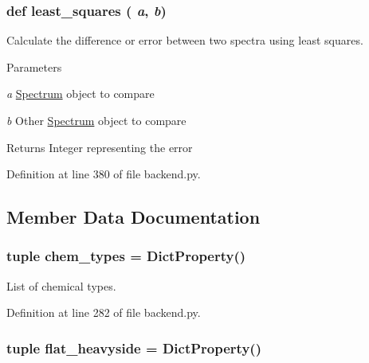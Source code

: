\hypertarget{classbackend_1_1_matcher_ab324f6c7c11f54b7617ecdee14f76049}{
\subsubsection[{least\_\-squares}]{\setlength{\rightskip}{0pt plus 5cm}def least\_\-squares ( {\em a}, \/   {\em b})}}
\label{classbackend_1_1_matcher_ab324f6c7c11f54b7617ecdee14f76049}


Calculate the difference or error between two spectra using least squares. 


\begin{DoxyParams}{Parameters}
\item[{\em a}]\hyperlink{classbackend_1_1_spectrum}{Spectrum} object to compare \item[{\em b}]Other \hyperlink{classbackend_1_1_spectrum}{Spectrum} object to compare \end{DoxyParams}
\begin{DoxyReturn}{Returns}
Integer representing the error 
\end{DoxyReturn}


Definition at line 380 of file backend.py.



\subsection{Member Data Documentation}
\hypertarget{classbackend_1_1_matcher_aaf40dbbcd44a623683ceae35f6e5e9ea}{
\subsubsection[{chem\_\-types}]{\setlength{\rightskip}{0pt plus 5cm}tuple {\bf chem\_\-types} = {\bf DictProperty}()}}
\label{classbackend_1_1_matcher_aaf40dbbcd44a623683ceae35f6e5e9ea}


List of chemical types. 



Definition at line 282 of file backend.py.

\hypertarget{classbackend_1_1_matcher_a8edb3e00a469bccb3c6a988e2162f51e}{
\subsubsection[{flat\_\-heavyside}]{\setlength{\rightskip}{0pt plus 5cm}tuple {\bf flat\_\-heavyside} = {\bf DictProperty}()}}
\label{classbackend_1_1_matcher_a8edb3e00a469bccb3c6a988e2162f51e}


